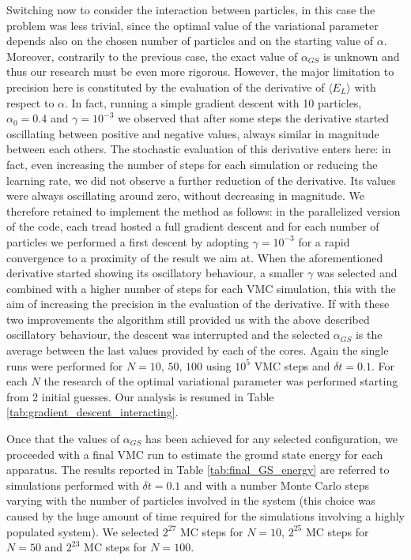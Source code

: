 Switching now to consider the interaction between particles, in this case the problem was less trivial, since the optimal value of the variational parameter depends also on the chosen number of particles and on the starting value of $\alpha$. Moreover, contrarily to the previous case, the exact value of $\alpha_{GS}$ is unknown and thus our research must be even more rigorous. However, the major limitation to precision here is constituted by the evaluation of the derivative of $\langle E_L \rangle$ with respect to $\alpha$. In fact, running a simple gradient descent with 10 particles, $\alpha_0=0.4$ and $\gamma=10^{-3}$ we observed that after some steps the derivative started oscillating between positive and negative values, always similar in magnitude between each others. The stochastic evaluation of this derivative enters here: in fact, even increasing the number of steps for each simulation or reducing the learning rate, we did not observe a further reduction of the derivative. Its values were always oscillating around zero, without decreasing in magnitude. We therefore retained to implement the method as follows: in the parallelized version of the code, each tread hosted a full gradient descent and for each number of particles we performed a first descent by adopting $\gamma=10^{-3}$ for a rapid convergence to a proximity of the result we aim at. When the aforementioned derivative started showing its oscillatory behaviour, a smaller $\gamma$ was selected and combined with a higher number of steps for each VMC simulation, this with the aim of increasing the precision in the evaluation of the derivative. If with these two improvements the algorithm still provided us with the above described oscillatory behaviour, the descent was interrupted and the selected $\alpha_{GS}$ is the average between the last values provided by each of the cores. Again the single runs were performed for $N=10,\,50,\,100$ using $10^5$ VMC steps and $\delta t =0.1$. For each $N$ the research of the optimal variational parameter was performed starting from 2 initial guesses. Our analysis is resumed in Table \ref{tab:gradient_descent_interacting}.

Once that the values of $\alpha_{GS}$ has been achieved for any selected configuration, we proceeded with a final VMC run to estimate the ground state energy for each apparatus. The results reported in Table \ref{tab:final_GS_energy} are referred to simulations performed with $\delta t = 0.1$ and with a number Monte Carlo steps varying with the number of particles involved in the system (this choice was caused by the huge amount of time required for the simulations involving a highly populated system). We selected $2^{27}$ MC steps for $N=10$, $2^{25}$ MC steps for $N=50$ and $2^{23}$ MC steps for $N=100$. 


